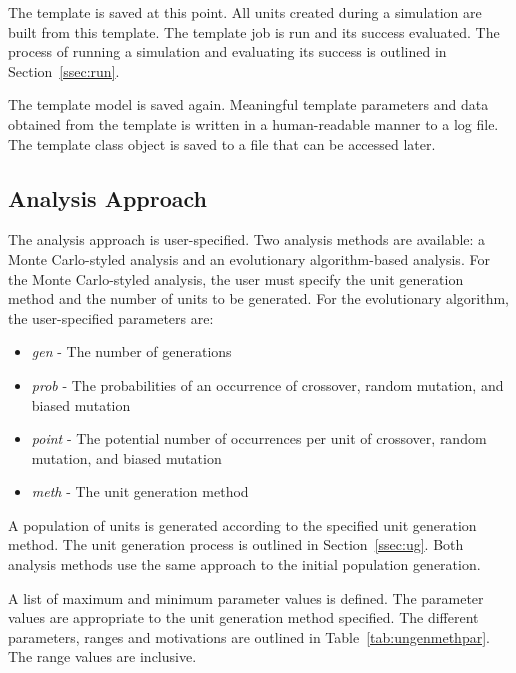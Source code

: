 The template is saved at this point. All units created during a simulation are built from this template. The template job is run and its success evaluated. The process of running a simulation and evaluating its success is outlined in Section~\ref{ssec:run}.

The template model is saved again. Meaningful template parameters and data obtained from the template is written in a human-readable manner to a log file. The template class object is saved to a file that can be accessed later.

\subsection{Analysis Approach}

The analysis approach is user-specified. Two analysis methods are available: a Monte Carlo-styled analysis and an evolutionary algorithm-based analysis. For the Monte Carlo-styled analysis, the user must specify the unit generation method and the number of units to be generated. For the evolutionary algorithm, the user-specified parameters are:

\begin{itemize}
	\item \textit{gen} - The number of generations
	\item \textit{prob} - The probabilities of an occurrence of crossover, random mutation, and biased mutation
	\item \textit{point} - The potential number of occurrences per unit of crossover, random mutation, and biased mutation
	\item \textit{meth} - The unit generation method
\end{itemize}

A population of units is generated according to the specified unit generation method. The unit generation process is outlined in Section~\ref{ssec:ug}. Both analysis methods use the same approach to the initial population generation.

A list of maximum and minimum parameter values is defined. The parameter values are appropriate to the unit generation method specified. The different parameters, ranges and motivations are outlined in Table~\ref{tab:ungenmethpar}. The range values are inclusive.

